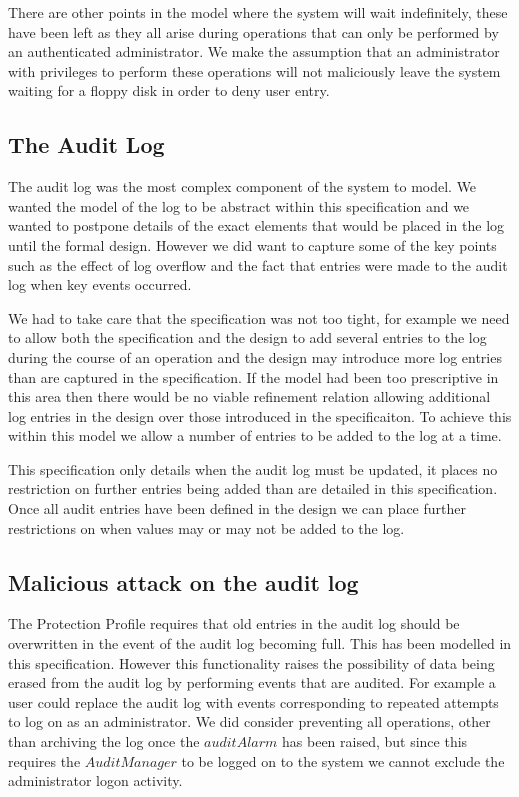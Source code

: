 There are other points in the model where the system will wait
indefinitely, these have been left as they all arise during operations
that can only be performed by an authenticated administrator. We make
the assumption that an administrator with privileges to perform these
operations will not maliciously leave the system waiting for a floppy
disk in order to deny user entry. 

\subsection{The Audit Log}
The audit log was the most complex component of the system to
model. We wanted the model of the log to be abstract within this
specification and we wanted to postpone details of the exact elements
that would be placed in the log until the formal design. However we did
want to capture some of the key points such as the effect of log
overflow and the fact that entries were made to the audit log when key
events occurred.

We had to take care that the specification was not too tight, for
example we need to allow both the specification and the design to add 
several entries to the log during the course of an operation and the
design may introduce more log entries than are captured in the
specification. If the model had been too prescriptive in this area
then 
there would be no viable refinement relation allowing additional 
log entries in the design over those introduced in the specificaiton.
To achieve this within this model we allow a number of entries to be
added to the log at a time. 

This specification only details when the audit log
must be updated, it places no restriction on further entries being
added than are detailed in this specification. Once all audit entries
have been defined in the design we can place further restrictions on
when values may or may not be added to the log.

\subsection{Malicious attack on the audit log}
The Protection Profile \cite{PP} requires that old entries in the
audit log should be overwritten in the event of the audit log becoming
full. This has been modelled in this specification. However this
functionality raises
the possibility of data being erased from the audit log by performing
events that are audited. For example a user could replace the audit
log with events corresponding to repeated attempts to log on as an
administrator. We did consider preventing all operations, other than
archiving the log once the $auditAlarm$ has been raised, but since
this requires the $AuditManager$ to be logged on to the system we
cannot exclude the administrator logon activity. 


